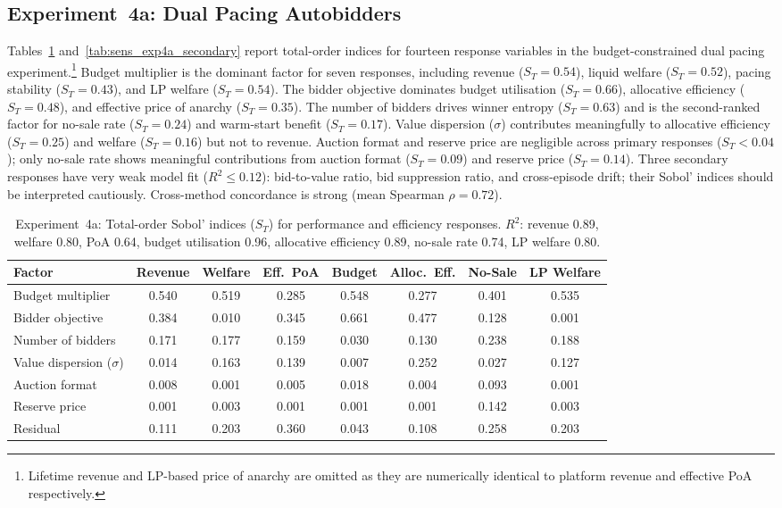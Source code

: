 \subsection{Experiment~4a: Dual Pacing Autobidders}
\label{sec:sens_exp4a}

Tables~\ref{tab:sens_exp4a_primary} and~\ref{tab:sens_exp4a_secondary} report total-order indices for fourteen response variables in the budget-constrained dual pacing experiment.\footnote{Lifetime revenue and LP-based price of anarchy are omitted as they are numerically identical to platform revenue and effective PoA respectively.} Budget multiplier is the dominant factor for seven responses, including revenue ($S_T = 0.54$), liquid welfare ($S_T = 0.52$), pacing stability ($S_T = 0.43$), and LP welfare ($S_T = 0.54$). The bidder objective dominates budget utilisation ($S_T = 0.66$), allocative efficiency ($S_T = 0.48$), and effective price of anarchy ($S_T = 0.35$). The number of bidders drives winner entropy ($S_T = 0.63$) and is the second-ranked factor for no-sale rate ($S_T = 0.24$) and warm-start benefit ($S_T = 0.17$). Value dispersion ($\sigma$) contributes meaningfully to allocative efficiency ($S_T = 0.25$) and welfare ($S_T = 0.16$) but not to revenue. Auction format and reserve price are negligible across primary responses ($S_T < 0.04$); only no-sale rate shows meaningful contributions from auction format ($S_T = 0.09$) and reserve price ($S_T = 0.14$). Three secondary responses have very weak model fit ($R^2 \leq 0.12$): bid-to-value ratio, bid suppression ratio, and cross-episode drift; their Sobol' indices should be interpreted cautiously. Cross-method concordance is strong (mean Spearman $\rho = 0.72$).

\begin{table}[H]
\centering
\caption{Experiment~4a: Total-order Sobol' indices ($S_T$) for performance and efficiency responses. $R^2$: revenue 0.89, welfare 0.80, PoA 0.64, budget utilisation 0.96, allocative efficiency 0.89, no-sale rate 0.74, LP welfare 0.80.}
\label{tab:sens_exp4a_primary}
\small
\begin{tabular}{l ccccccc}
\toprule
Factor & Revenue & Welfare & Eff.\ PoA & Budget & Alloc.\ Eff. & No-Sale & LP Welfare \\
\midrule
Budget multiplier         & 0.540 & 0.519 & 0.285 & 0.548 & 0.277 & 0.401 & 0.535 \\
Bidder objective          & 0.384 & 0.010 & 0.345 & 0.661 & 0.477 & 0.128 & 0.001 \\
Number of bidders         & 0.171 & 0.177 & 0.159 & 0.030 & 0.130 & 0.238 & 0.188 \\
Value dispersion ($\sigma$) & 0.014 & 0.163 & 0.139 & 0.007 & 0.252 & 0.027 & 0.127 \\
Auction format            & 0.008 & 0.001 & 0.005 & 0.018 & 0.004 & 0.093 & 0.001 \\
Reserve price             & 0.001 & 0.003 & 0.001 & 0.001 & 0.001 & 0.142 & 0.003 \\
\midrule
Residual                  & 0.111 & 0.203 & 0.360 & 0.043 & 0.108 & 0.258 & 0.203 \\
\bottomrule
\end{tabular}
\end{table}

